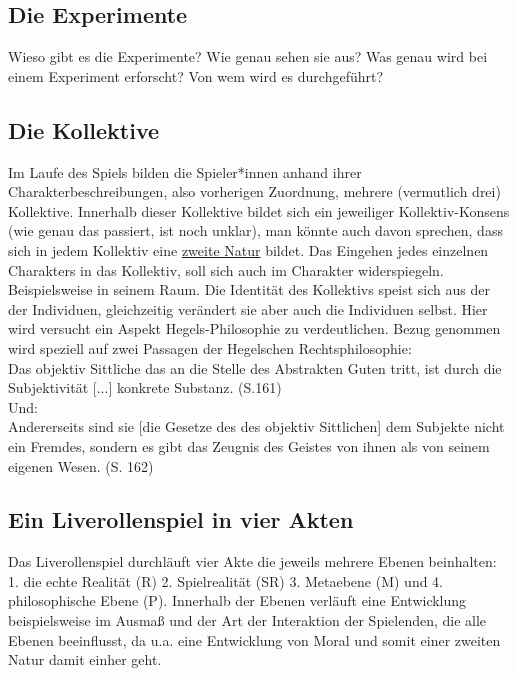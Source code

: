 \documentclass[a4paper, 12pt]{scrartcl}
\begin{document}
    \subsection{Die Experimente}
    Wieso gibt es die Experimente? 
    Wie genau sehen sie aus? 
    Was genau wird bei einem Experiment erforscht? 
    Von wem wird es durchgeführt? \\
    \subsection{Die Kollektive}
    Im Laufe des Spiels bilden die Spieler*innen anhand ihrer Charakterbeschreibungen, also vorherigen Zuordnung, mehrere (vermutlich drei) Kollektive. 
    Innerhalb dieser Kollektive bildet sich ein jeweiliger Kollektiv-Konsens (wie genau das passiert, ist noch unklar), man könnte auch davon sprechen, dass sich in jedem Kollektiv eine \hyperref[zweite-natur]{\glqq zweite Natur\grqq{}} bildet. 
    Das Eingehen jedes einzelnen Charakters in das Kollektiv, soll sich auch im Charakter widerspiegeln. Beispielsweise in seinem Raum. Die Identität des Kollektivs speist sich aus der der Individuen, gleichzeitig verändert sie aber auch die Individuen selbst. 
    Hier wird versucht ein Aspekt Hegels-Philosophie zu verdeutlichen. Bezug genommen wird speziell auf zwei Passagen der Hegelschen Rechtsphilosophie: \\
    \glqq Das objektiv Sittliche das an die Stelle des Abstrakten Guten tritt, ist durch die Subjektivität [...] konkrete Substanz.\grqq{} (S.161)\cite{hegel:rph} \\
    Und:\\
    \glqq Andererseits sind sie [die Gesetze des des objektiv Sittlichen] dem Subjekte nicht ein Fremdes, sondern es gibt das Zeugnis des Geistes von ihnen als von seinem eigenen Wesen.\grqq{} (S. 162)\cite{hegel:rph} 
    
    \subsection{Ein Liverollenspiel in vier Akten}
    Das Liverollenspiel durchläuft vier Akte die jeweils mehrere Ebenen beinhalten: 1. die echte Realität (R) 2. Spielrealität (SR) 3. Metaebene (M) und 4. philosophische Ebene (P). Innerhalb der Ebenen verläuft eine Entwicklung beispielsweise im Ausmaß und der Art der Interaktion der Spielenden, die alle Ebenen beeinflusst, da u.a. eine Entwicklung von Moral und somit einer zweiten Natur damit einher geht.
\end{document}
